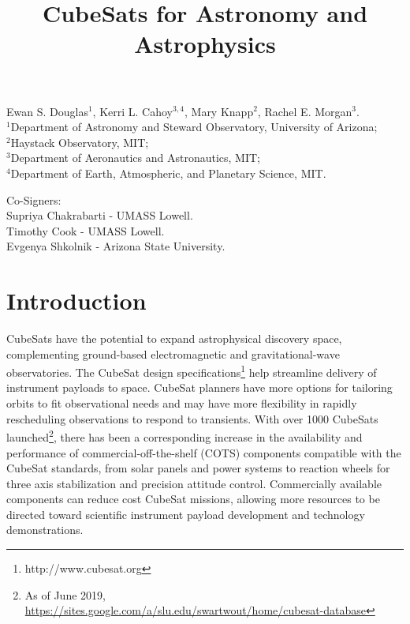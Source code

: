\documentclass[12pt]{article}
\title{CubeSats for Astronomy and Astrophysics}
\begin{document}
\maketitle
\begin{center}
    
Ewan S. Douglas$^1$,
Kerri L. Cahoy$^{3,4}$,
Mary Knapp$^2$,
Rachel E. Morgan$^3$.
\\
$^1$Department of Astronomy and Steward Observatory, University of Arizona;\\
$^2$Haystack Observatory, MIT;\\
$^3$Department of Aeronautics and Astronautics, MIT;\\
$^4$Department of Earth, Atmospheric, and Planetary Science, MIT.\\
\end{center}
Co-Signers:\\
Supriya Chakrabarti - UMASS Lowell. \\
Timothy Cook - UMASS Lowell.\\
Evgenya Shkolnik - Arizona State University.






\section{Introduction}
CubeSats have the potential to expand astrophysical discovery space, complementing ground-based electromagnetic and gravitational-wave observatories. The CubeSat design specifications\footnote{http://www.cubesat.org} help streamline delivery of instrument payloads to space. 
CubeSat planners have more options for tailoring orbits to fit observational needs and may have more flexibility in rapidly rescheduling observations to respond to transients. With over 1000 CubeSats launched\footnote{As of June 2019, \url{https://sites.google.com/a/slu.edu/swartwout/home/cubesat-database}}, there has been a corresponding increase in the availability and performance of commercial-off-the-shelf (COTS) components compatible with the CubeSat standards, from solar panels and power systems to reaction wheels for three axis stabilization and precision attitude control. Commercially available components can reduce cost CubeSat missions, allowing more resources to be directed toward scientific instrument payload development and technology demonstrations. 
\end{document}
